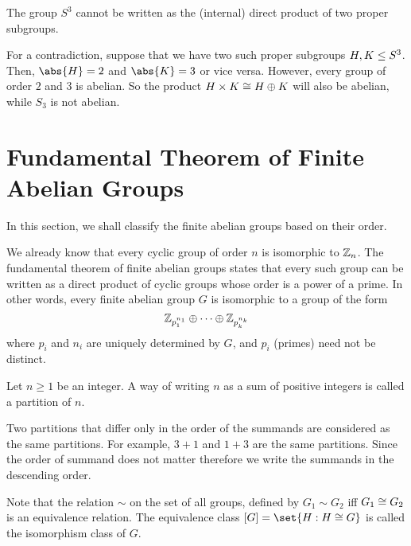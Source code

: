 \documentclass[11pt]{penrose}
\begin{document}
\begin{negg}
    The group $S^{3}$ cannot be written as the (internal) direct product of two proper subgroups.

    For a contradiction, suppose that we have two such proper subgroups $H, K \mathrel{\leq} S^{3}$. Then, $\abs{H} = 2$ and $\abs{K} = 3$ or vice versa. However, every group of order $2$ and $3$ is abelian. So the product $H \times K \mathrel{\cong} H \oplus K$ will also be abelian, while $S_{3}$ is not abelian. \eggqed
\end{negg}

\section{Fundamental Theorem of Finite Abelian Groups}
In this section, we shall classify the finite abelian groups based on their order.

We already know that every cyclic group of order $n$ is isomorphic to $\mathbb{Z}_{n}$. The fundamental theorem of finite abelian groups states that every such group can be written as a direct product of cyclic groups whose order is a power of a prime. In other words, every finite abelian group $G$ is isomorphic to a group of the form
\begin{equation*}
    \mathbb{Z}_{p_{1}^{n_{1}}} \oplus \dots \oplus \mathbb{Z}_{p_{k}^{n_{k}}}
\end{equation*}
where $p_{i}$ and $n_{i}$ are uniquely determined by $G$, and $p_{i}$ (primes) need not be distinct.

\begin{ndfn}
    Let $n \geq 1$ be an integer. A way of writing $n$ as a sum of positive integers is called a partition of $n$.
\end{ndfn}

Two partitions that differ only in the order of the summands are considered as the same partitions. For example, $3+1$ and $1+3$ are the same partitions. Since the order of summand does not matter therefore we write the summands in the descending order.

Note that the relation $\sim$ on the set of all groups, defined by $G_{1} \sim G_{2}$ iff $G_{1} \mathrel{\cong} G_{2}$ is an equivalence relation. The equivalence class $[G] = \set{H : H \isom G}$ is called the isomorphism class of $G$.
\end{document}
